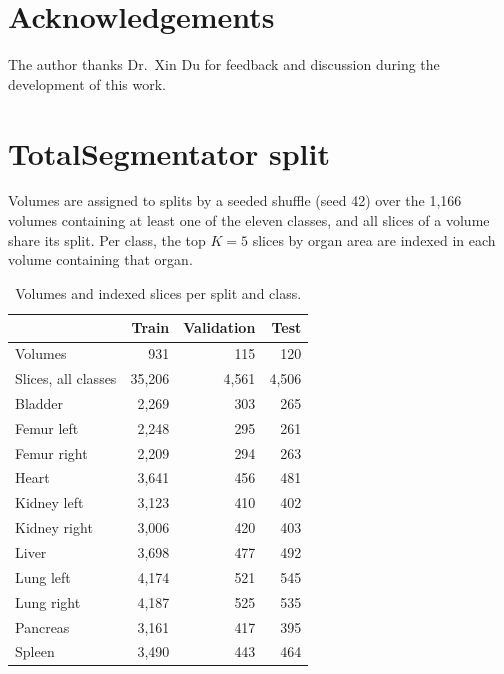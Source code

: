 \documentclass[10pt]{article}
\begin{document}
\section*{Acknowledgements}
The author thanks Dr.\ Xin Du for feedback and discussion during the development
of this work.

{\footnotesize
\setlength{\bibsep}{1.5pt plus 0.3ex}

}

\appendix


\section{TotalSegmentator split}
\label{app:split}

Volumes are assigned to splits by a seeded shuffle (seed 42) over the 1{,}166
volumes containing at least one of the eleven classes, and all slices of a volume
share its split. Per class, the top $K=5$ slices by organ area are indexed in each
volume containing that organ.

\begin{table}[H]
\centering
\small
\caption{Volumes and indexed slices per split and class.}
\label{tab:split}
\begin{tabular}{lrrr}
\toprule
 & Train & Validation & Test \\
\midrule
Volumes & 931 & 115 & 120 \\
Slices, all classes & 35{,}206 & 4{,}561 & 4{,}506 \\
\midrule
Bladder      & 2{,}269 & 303 & 265 \\
Femur left   & 2{,}248 & 295 & 261 \\
Femur right  & 2{,}209 & 294 & 263 \\
Heart        & 3{,}641 & 456 & 481 \\
Kidney left  & 3{,}123 & 410 & 402 \\
Kidney right & 3{,}006 & 420 & 403 \\
Liver        & 3{,}698 & 477 & 492 \\
Lung left    & 4{,}174 & 521 & 545 \\
Lung right   & 4{,}187 & 525 & 535 \\
Pancreas     & 3{,}161 & 417 & 395 \\
Spleen       & 3{,}490 & 443 & 464 \\
\bottomrule
\end{tabular}
\end{table}
\end{document}
